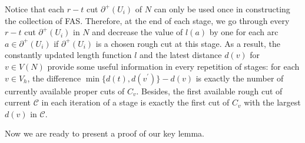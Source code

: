 \documentclass[11pt]{article}
\begin{document}
Notice that each $r-t$ cut $\partial^+(U_i)$ of $N$ can only be used once in constructing the collection of FAS. Therefore, at the end of each stage, we go through every $r-t$ cut $\partial^+(U_i)$ in $N$ and decrease the value of $l(a)$ by one for each arc $a\in \partial^+(U_i)$ if $\partial^+(U_i)$ is a chosen rough cut at this stage. As a result, the constantly updated length function $l$ and the latest distance $d(v)$ for $v\in V(N)$ provide some useful information in every repetition of stages: for each $v\in V_h$, the difference $\min\{d(t),d(v^\prime)\}-d(v)$ is exactly the number of currently available proper cuts of $C_v$. Besides, the first available rough cut of current $\mathcal{C}$ in each iteration of a stage is exactly the first cut of $C_v$ with the largest $d(v)$ in $\mathcal{C}$.

Now we are ready to present a proof of our key lemma.
\end{document}
